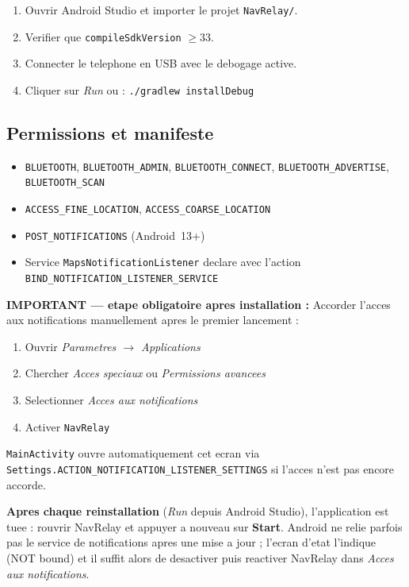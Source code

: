 \documentclass[a4paper,11pt]{article}
\begin{document}
\begin{enumerate}
  \item Ouvrir Android Studio et importer le projet \texttt{NavRelay/}.
  \item Verifier que \texttt{compileSdkVersion} $\geq 33$.
  \item Connecter le telephone en USB avec le debogage active.
  \item Cliquer sur \emph{Run} ou : \texttt{./gradlew installDebug}
\end{enumerate}

\subsection{Permissions et manifeste}

\begin{itemize}
  \item \texttt{BLUETOOTH}, \texttt{BLUETOOTH\_ADMIN}, \texttt{BLUETOOTH\_CONNECT},
    \texttt{BLUETOOTH\_ADVERTISE}, \texttt{BLUETOOTH\_SCAN}
  \item \texttt{ACCESS\_FINE\_LOCATION}, \texttt{ACCESS\_COARSE\_LOCATION}
  \item \texttt{POST\_NOTIFICATIONS} (Android~13+)
  \item Service \texttt{MapsNotificationListener} declare avec l'action
    \texttt{BIND\_NOTIFICATION\_LISTENER\_SERVICE}
\end{itemize}

\textbf{IMPORTANT --- etape obligatoire apres installation :} Accorder l'acces aux notifications
manuellement apres le premier lancement :
\begin{enumerate}
  \item Ouvrir \textit{Parametres $\to$ Applications}
  \item Chercher \textit{Acces speciaux} ou \textit{Permissions avancees}
  \item Selectionner \textit{Acces aux notifications}
  \item Activer \texttt{NavRelay}
\end{enumerate}

\texttt{MainActivity} ouvre automatiquement cet ecran via
\texttt{Settings.ACTION\_NOTIFICATION\_LISTENER\_SETTINGS} si l'acces n'est pas encore accorde.

\textbf{Apres chaque reinstallation} (\emph{Run} depuis Android Studio), l'application est
tuee : rouvrir NavRelay et appuyer a nouveau sur \textbf{Start}. Android ne relie parfois pas
le service de notifications apres une mise a jour ; l'ecran d'etat l'indique
(\og NOT bound\fg{}) et il suffit alors de desactiver puis reactiver NavRelay dans
\emph{Acces aux notifications}.
\end{document}
